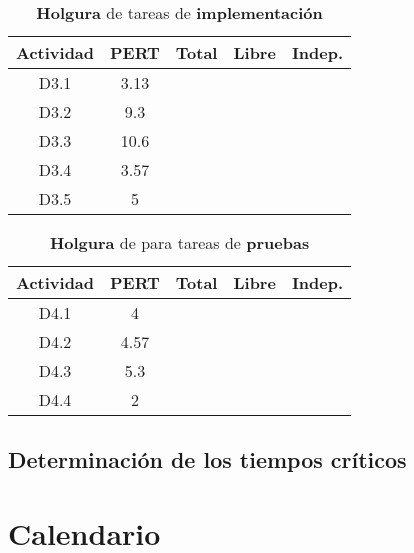 \documentclass[11pt,a4paper,spanish,twoside]{report}
\begin{document}
{\begin{table}[!h]
\centering
  \begin{tabular}{|c||c||c|c|c|}
    \hline
     \textbf{Actividad} & \textbf{PERT} & \textbf{Total} & \textbf{Libre}
    & \textbf{Indep.}\\
    \hline \hline
    D3.1 & 3.13 & & & \\
    \hline
    D3.2 & 9.3 & & & \\
    \hline
    D3.3 & 10.6 & & & \\
    \hline
    D3.4 & 3.57 & & & \\
    \hline
    D3.5 & 5 & & & \\
    \hline
  \end{tabular}
  \caption{\textbf{Holgura} de tareas de \textbf{implementación}}
  \label{Tab:hol3}
\end{table}

\begin{table}[!h]
\centering
  \begin{tabular}{|c||c||c|c|c|}
    \hline
     \textbf{Actividad} & \textbf{PERT} & \textbf{Total} & \textbf{Libre}
    & \textbf{Indep.}\\
    \hline \hline
    D4.1 & 4 & & & \\
    \hline
    D4.2 & 4.57 & & & \\
    \hline
    D4.3 & 5.3 & & & \\
    \hline
    D4.4 & 2 & & & \\
    \hline
  \end{tabular}
  \caption{\textbf{Holgura} de para tareas de \textbf{pruebas}}
  \label{Tab:hol4}
\end{table}

\section{Determinación de los tiempos críticos}

\chapter{Calendario}

}
\end{document}
